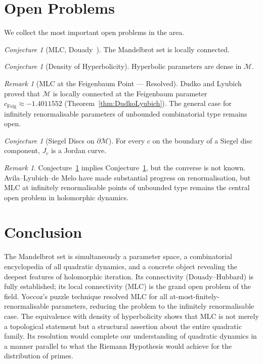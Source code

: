 \documentclass[12pt,a4paper]{amsart}
\theoremstyle{definition}
\theoremstyle{remark}
\newtheorem{remark}[theorem]{Remark}
\newtheorem{conjecture}[theorem]{Conjecture}
\begin{document}
\section{Open Problems}

We collect the most important open problems in the area.

\begin{conjecture}[MLC, Douady~\cite{DouadyHubbard1982}]
\label{conj:MLC2}
The Mandelbrot set is locally connected.
\end{conjecture}

\begin{conjecture}[Density of Hyperbolicity]
\label{conj:DHyp}
Hyperbolic parameters are dense in $\mathcal{M}$.
\end{conjecture}

\begin{remark}[MLC at the Feigenbaum Point — Resolved]
Dudko and Lyubich~\cite{DudkoLyubich2023} proved that $\mathcal{M}$
is locally connected at the Feigenbaum parameter
$c_{\mathrm{Feig}} \approx -1.4011552$
(Theorem~\ref{thm:DudkoLyubich}). The general case for infinitely
renormalisable parameters of unbounded combinatorial type remains open.
\end{remark}

\begin{conjecture}[Siegel Discs on $\partial\mathcal{M}$]
For every $c$ on the boundary of a Siegel disc component, $J_c$ is a
Jordan curve.
\end{conjecture}

\begin{remark}
Conjecture~\ref{conj:MLC2} implies Conjecture~\ref{conj:DHyp}, but the
converse is not known. Avila--Lyubich--de Melo have made substantial
progress on renormalisation, but MLC at infinitely renormalisable points
of unbounded type remains the central open problem in holomorphic dynamics.
\end{remark}

\section{Conclusion}

The Mandelbrot set is simultaneously a parameter space, a combinatorial
encyclopedia of all quadratic dynamics, and a concrete object revealing the
deepest features of holomorphic iteration. Its connectivity
(Douady--Hubbard) is fully established; its local connectivity (MLC) is the
grand open problem of the field. Yoccoz's puzzle technique resolved MLC for
all at-most-finitely-renormalisable parameters, reducing the problem to
the infinitely renormalisable case. The equivalence with density of
hyperbolicity shows that MLC is not merely a topological statement but
a structural assertion about the entire quadratic family. Its resolution
would complete our understanding of quadratic dynamics in a manner parallel
to what the Riemann Hypothesis would achieve for the distribution of primes.
\end{document}

